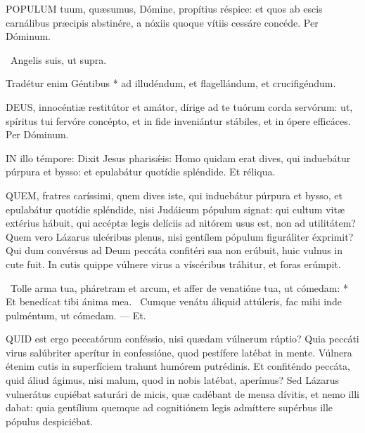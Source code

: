 \lettrine[lines=2]{P}{OPULUM} tuum, quæsumus, Dómine, propítius réspice: et quos ab escis carnálibus præcipis abstinére, a nóxiis quoque vítiis cessáre concéde. Per Dóminum.

\V\ Angelis suis, ut supra.

 Tradétur enim Géntibus * ad illudéndum, et flagellándum, et crucifigéndum.


\lettrine[lines=2]{D}{EUS}, innocéntiæ restitútor et amátor, dírige ad te tuórum corda servórum: ut, spíritus tui fervóre concépto, et in fide inveniántur stábiles, et in ópere efficáces. Per Dóminum.

\sectionornament




\lettrine[lines=2]{I}{N} illo témpore: Dixit Jesus pharisǽis: Homo quidam erat dives, qui induebátur púrpura et bysso: et epulabátur quotídie spléndide. Et réliqua.



\lettrine[lines=2]{Q}{UEM}, fratres caríssimi, quem dives iste, qui induebátur púrpura et bysso, et epulabátur quotídie spléndide, nisi Judáicum pópulum signat: qui cultum vitæ extérius hábuit, qui accéptæ legis delíciis ad nitórem usus est, non ad utilitátem? Quem vero Lázarus ulcéribus plenus, nisi gentílem pópulum figuráliter éxprimit? Qui dum convérsus ad Deum peccáta confitéri sua non erúbuit, huic vulnus in cute fuit. In cutis quippe vúlnere virus a víscéribus tráhitur, et foras erúmpit.

\R\ Tolle arma tua, pháretram et arcum, et affer de venatióne tua, ut cómedam: * Et benedícat tibi ánima mea. \V\ Cumque venátu áliquid attúleris, fac mihi inde pulméntum, ut cómedam. --- Et.


\lettrine[lines=2]{Q}{UID} est ergo peccatórum conféssio, nisi quædam vúlnerum rúptio? Quia peccáti virus salúbriter aperítur in confessióne, quod pestífere latébat in mente. Vúlnera étenim cutis in superfíciem trahunt humórem putrédinis. Et confiténdo peccáta, quid áliud ágimus, nisi malum, quod in nobis latébat, aperímus? Sed Lázarus vulnerátus cupiébat saturári de micis, quæ cadébant de mensa dívitis, et nemo illi dabat: quia gentílium quemque ad cognitiónem legis admíttere supérbus ille pópulus despiciébat.

